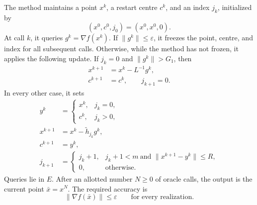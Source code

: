 \documentclass[10pt]{article}
\theoremstyle{definition}
\begin{document}
The method maintains a point $x^k$, a restart centre $c^k$, and an index $j_k$, initialized by
\[
(x^0,c^0,j_0)=(x^0,x^0,0).
\]
At call $k$, it queries $g^k=\nabla f(x^k)$. If $\|g^k\|\leq\varepsilon$, it freezes the point, centre, and index for all subsequent calls. Otherwise, while the method has not frozen, it applies the following update. If $j_k=0$ and $\|g^k\|>G_1$, then
\[
\begin{aligned}
x^{k+1}&=x^k-L^{-1}g^k,\\
c^{k+1}&=c^k,\qquad j_{k+1}=0.
\end{aligned}
\]
In every other case, it sets
\[
\begin{aligned}
y^k&=\begin{cases}
x^k,&j_k=0,\\
c^k,&j_k>0,
\end{cases}\\
x^{k+1}&=x^k-\widetilde h_{j_k}g^k,\\
c^{k+1}&=y^k,\\
j_{k+1}&=\begin{cases}
j_k+1,&j_k+1<m\ \text{and }\|x^{k+1}-y^k\|\leq R,\\
0,&\text{otherwise}.
\end{cases}
\end{aligned}
\]
Queries lie in $E$. After an allotted number $N\geq0$ of oracle calls, the output is the current point $\bar{x}=x^N$. The required accuracy is
\[
\|\nabla f(\bar{x})\|\leq\varepsilon
\qquad\text{for every realization}.
\]
\end{document}
